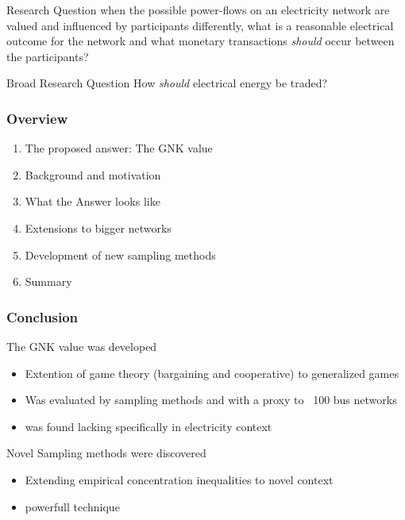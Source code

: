 \documentclass{beamer}
\begin{document}
\begin{frame}
\begin{block}{Research Question}
when the possible power-flows on an electricity network are valued and influenced by participants differently, 
what is a reasonable electrical outcome for the network and what monetary transactions \textit{should} occur between the participants?
\end{block}
\begin{block}{Broad Research Question}
How \textit{should} electrical energy be traded?
\end{block}
\end{frame}


\begin{frame}
\frametitle{Overview}
\begin{enumerate}
\item	The proposed answer: The GNK value
\item	Background and motivation
\item	What the Answer looks like
\item	Extensions to bigger networks
\item	Development of new sampling methods
\item	Summary
\end{enumerate}
\end{frame}






\begin{frame}
\frametitle{Conclusion}
The GNK value was developed
\begin{itemize}
\item	Extention of game theory (bargaining and cooperative) to generalized games
\item	Was evaluated by sampling methods and with a proxy to ~100 bus networks
\item	was found lacking specifically in electricity context
\end{itemize}
Novel Sampling methods were discovered
\begin{itemize}
\item	Extending empirical concentration inequalities to novel context
\item	powerfull technique
\end{itemize}
\end{frame}
\end{document}

